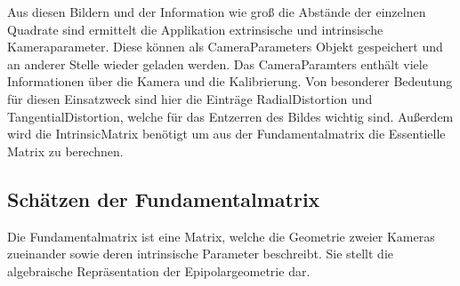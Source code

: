 Aus diesen Bildern und der Information wie groß die Abstände der einzelnen Quadrate sind ermittelt die Applikation extrinsische und intrinsische Kameraparameter. Diese können als CameraParameters Objekt gespeichert und an anderer Stelle wieder geladen werden. Das CameraParamters enthält viele Informationen über die Kamera und die Kalibrierung. Von besonderer Bedeutung für diesen Einsatzweck sind hier die Einträge RadialDistortion und TangentialDistortion, welche für das Entzerren des Bildes wichtig sind. Außerdem wird die IntrinsicMatrix benötigt um aus der Fundamentalmatrix die Essentielle Matrix zu berechnen. \cite{Mathworksa}

\subsection{Schätzen der Fundamentalmatrix}
\label{sec:Schätzen der Fundamentalmatrix}
Die Fundamentalmatrix ist eine Matrix, welche die Geometrie zweier Kameras zueinander sowie deren intrinsische Parameter beschreibt. Sie stellt die algebraische Repräsentation der Epipolargeometrie dar.\cite{Richard2000}

